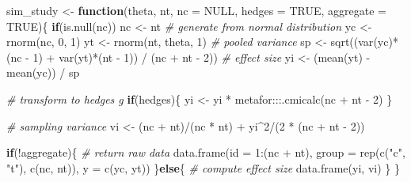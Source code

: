 \documentclass[
  man,floatsintext]{apa6}
\newenvironment{Shaded}{\begin{snugshade}}{\end{snugshade}}
\newcommand{\AttributeTok}[1]{\textcolor[rgb]{0.77,0.63,0.00}{#1}}
\newcommand{\CommentTok}[1]{\textcolor[rgb]{0.56,0.35,0.01}{\textit{#1}}}
\newcommand{\ConstantTok}[1]{\textcolor[rgb]{0.00,0.00,0.00}{#1}}
\newcommand{\ControlFlowTok}[1]{\textcolor[rgb]{0.13,0.29,0.53}{\textbf{#1}}}
\newcommand{\DecValTok}[1]{\textcolor[rgb]{0.00,0.00,0.81}{#1}}
\newcommand{\FunctionTok}[1]{\textcolor[rgb]{0.00,0.00,0.00}{#1}}
\newcommand{\NormalTok}[1]{#1}
\newcommand{\OtherTok}[1]{\textcolor[rgb]{0.56,0.35,0.01}{#1}}
\newcommand{\SpecialCharTok}[1]{\textcolor[rgb]{0.00,0.00,0.00}{#1}}
\newcommand{\StringTok}[1]{\textcolor[rgb]{0.31,0.60,0.02}{#1}}
\begin{document}
\begin{Shaded}
\begin{Highlighting}[]

\NormalTok{sim\_study }\OtherTok{\textless{}{-}} \ControlFlowTok{function}\NormalTok{(theta, nt, }\AttributeTok{nc =} \ConstantTok{NULL}\NormalTok{, }\AttributeTok{hedges =} \ConstantTok{TRUE}\NormalTok{, }\AttributeTok{aggregate =} \ConstantTok{TRUE}\NormalTok{)\{}
  \ControlFlowTok{if}\NormalTok{(}\FunctionTok{is.null}\NormalTok{(nc)) nc }\OtherTok{\textless{}{-}}\NormalTok{ nt}
  \CommentTok{\# generate from normal distribution}
\NormalTok{  yc }\OtherTok{\textless{}{-}} \FunctionTok{rnorm}\NormalTok{(nc, }\DecValTok{0}\NormalTok{, }\DecValTok{1}\NormalTok{)}
\NormalTok{  yt }\OtherTok{\textless{}{-}} \FunctionTok{rnorm}\NormalTok{(nt, theta, }\DecValTok{1}\NormalTok{)}
  \CommentTok{\# pooled variance}
\NormalTok{  sp }\OtherTok{\textless{}{-}} \FunctionTok{sqrt}\NormalTok{((}\FunctionTok{var}\NormalTok{(yc)}\SpecialCharTok{*}\NormalTok{(nc }\SpecialCharTok{{-}} \DecValTok{1}\NormalTok{) }\SpecialCharTok{+} \FunctionTok{var}\NormalTok{(yt)}\SpecialCharTok{*}\NormalTok{(nt }\SpecialCharTok{{-}} \DecValTok{1}\NormalTok{)) }\SpecialCharTok{/}\NormalTok{ (nc }\SpecialCharTok{+}\NormalTok{ nt }\SpecialCharTok{{-}} \DecValTok{2}\NormalTok{))}
  \CommentTok{\# effect size}
\NormalTok{  yi }\OtherTok{\textless{}{-}}\NormalTok{ (}\FunctionTok{mean}\NormalTok{(yt) }\SpecialCharTok{{-}} \FunctionTok{mean}\NormalTok{(yc)) }\SpecialCharTok{/}\NormalTok{ sp}
  
  \CommentTok{\# transform to hedges\textquotesingle{} g}
  \ControlFlowTok{if}\NormalTok{(hedges)\{}
\NormalTok{    yi }\OtherTok{\textless{}{-}}\NormalTok{ yi }\SpecialCharTok{*}\NormalTok{ metafor}\SpecialCharTok{:::}\FunctionTok{.cmicalc}\NormalTok{(nc }\SpecialCharTok{+}\NormalTok{ nt }\SpecialCharTok{{-}} \DecValTok{2}\NormalTok{)}
\NormalTok{  \}}
  
  \CommentTok{\# sampling variance}
\NormalTok{  vi }\OtherTok{\textless{}{-}}\NormalTok{ (nc }\SpecialCharTok{+}\NormalTok{ nt)}\SpecialCharTok{/}\NormalTok{(nc }\SpecialCharTok{*}\NormalTok{ nt) }\SpecialCharTok{+}\NormalTok{ yi}\SpecialCharTok{\^{}}\DecValTok{2}\SpecialCharTok{/}\NormalTok{(}\DecValTok{2} \SpecialCharTok{*}\NormalTok{ (nc }\SpecialCharTok{+}\NormalTok{ nt }\SpecialCharTok{{-}} \DecValTok{2}\NormalTok{))}
  
  \ControlFlowTok{if}\NormalTok{(}\SpecialCharTok{!}\NormalTok{aggregate)\{}
    \CommentTok{\# return raw data}
    \FunctionTok{data.frame}\NormalTok{(}\AttributeTok{id =} \DecValTok{1}\SpecialCharTok{:}\NormalTok{(nc }\SpecialCharTok{+}\NormalTok{ nt),}
               \AttributeTok{group =} \FunctionTok{rep}\NormalTok{(}\FunctionTok{c}\NormalTok{(}\StringTok{"c"}\NormalTok{, }\StringTok{"t"}\NormalTok{), }\FunctionTok{c}\NormalTok{(nc, nt)),}
               \AttributeTok{y =} \FunctionTok{c}\NormalTok{(yc, yt))}
\NormalTok{  \}}\ControlFlowTok{else}\NormalTok{\{}
    \CommentTok{\# compute effect size}
    \FunctionTok{data.frame}\NormalTok{(yi, vi)}
\NormalTok{  \}}
\NormalTok{\}}


\end{Highlighting}
\end{Shaded}
\end{document}

